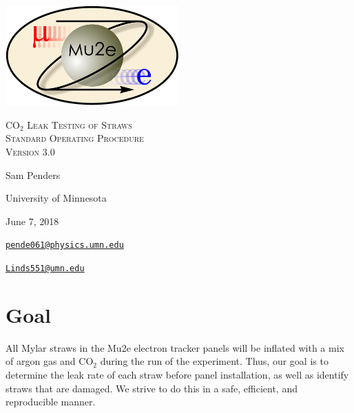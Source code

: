 \documentclass[letterpaper,12pt]{article}
\begin{document}
\begin{titlepage}
	\centering
	\includegraphics[width=0.5\textwidth]{mu2e_logo_oval.png}\par\vspace{2cm}
	{\scshape\LARGE CO$_2$ Leak Testing of Straws \\
		Standard Operating Procedure \\ Version 3.0 \par}
	\vspace{3cm}
	{\Large Sam Penders\par}
    \vspace{.5cm}
	\vspace{3cm}
	{\large University of Minnesota\par}
 	\vspace{.5cm}
	{\large June 7, 2018\par}
	\vfill
	{\href{mailto:pende061@physics.umn.edu}
    {\tt{pende061@physics.umn.edu}}\par}
	
    {\href{Linds551@umn.edu}
    {\tt{Linds551@umn.edu}}\par}
\end{titlepage}

\clearpage
\setcounter{page}{1}

\newenvironment{myitemize} %
{ \begin{itemize}
    \setlength{\itemsep}{4pt}
    \setlength{\parskip}{0pt}
    \setlength{\parsep}{0pt}     }
{ \end{itemize}                  } 

\section{Goal}
All Mylar straws in the Mu2e electron tracker panels will be inflated with a mix of argon gas and CO$_2$ during the run of the experiment. Thus, our goal is to determine the leak rate of each straw before panel installation, as well as identify straws that are damaged. We strive to do this in a safe, efficient, and reproducible manner.
\end{document}
